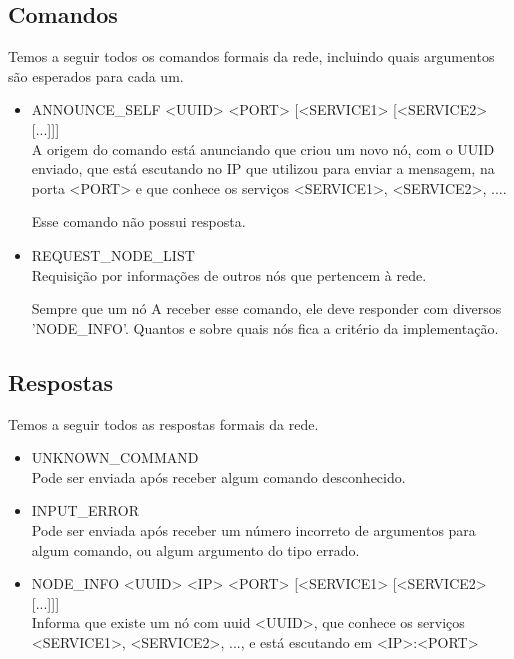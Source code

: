   \subsection{Comandos}
    Temos a seguir todos os comandos formais da rede, incluindo quais argumentos são esperados
    para cada um.
      
    \begin{itemize}
      \item ANNOUNCE\_SELF <UUID> <PORT> [<SERVICE1> [<SERVICE2> [...]]] \\
        A origem do comando está anunciando que criou um novo nó, com o UUID enviado, que está
        escutando no IP que utilizou para enviar a mensagem, na porta <PORT> e que conhece
        os serviços <SERVICE1>, <SERVICE2>, ....
        
        Esse comando não possui resposta.
    
      \item REQUEST\_NODE\_LIST \\
        Requisição por informações de outros nós que pertencem à rede.
        
        Sempre que um nó A receber esse comando, ele deve responder com diversos 'NODE\_INFO'.
        Quantos e sobre quais nós fica a critério da implementação.
        
    \end{itemize}
  
  \subsection{Respostas}
    Temos a seguir todos as respostas formais da rede.
    
    \begin{itemize}
      \item UNKNOWN\_COMMAND \\
        Pode ser enviada após receber algum comando desconhecido.
        
      \item INPUT\_ERROR \\
        Pode ser enviada após receber um número incorreto de argumentos para algum comando, ou algum
        argumento do tipo errado.
    
      \item NODE\_INFO <UUID> <IP> <PORT> [<SERVICE1> [<SERVICE2> [...]]] \\
        Informa que existe um nó com uuid <UUID>, que conhece os serviços <SERVICE1>, <SERVICE2>, ...,
        e está escutando em <IP>:<PORT>
          
    \end{itemize}
  

